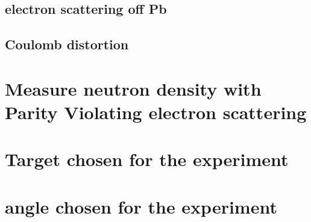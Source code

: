 \subsection{electron scattering off Pb}

\subsection{Coulomb distortion}

\section{Measure neutron density with Parity Violating electron scattering}

\section{Target chosen for the experiment}
\section{angle chosen for the experiment}






